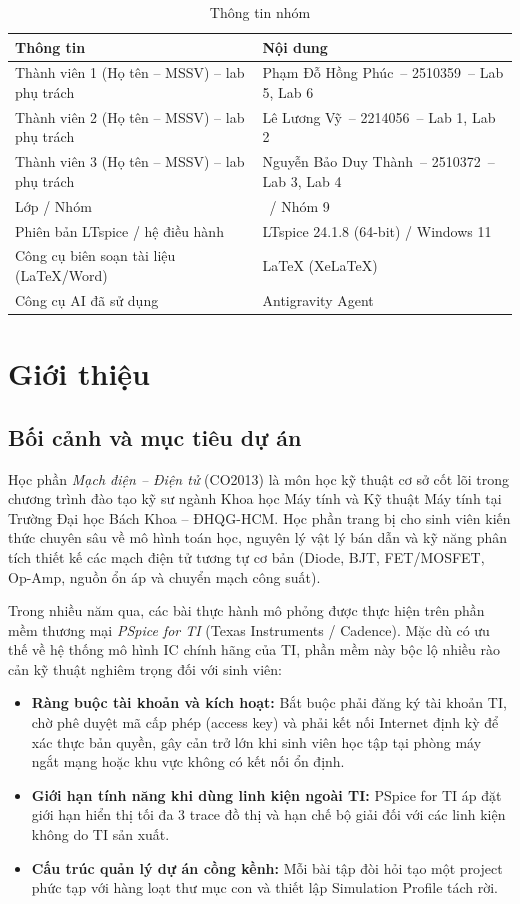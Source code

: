 \documentclass[12pt,a4paper]{article}
\newcommand{\NhomSo}{9}                          %
\newcommand{\LopHoc}{\dotuline}                  %
\newcommand{\TVa}{Phạm Đỗ Hồng Phúc}   \newcommand{\MSa}{2510359}   \newcommand{\PTa}{-- Lab 5, Lab 6}  %
\newcommand{\TVb}{Lê Lương Vỹ}          \newcommand{\MSb}{2214056}   \newcommand{\PTb}{-- Lab 1, Lab 2}  %
\newcommand{\TVc}{Nguyễn Bảo Duy Thành} \newcommand{\MSc}{2510372}   \newcommand{\PTc}{-- Lab 3, Lab 4}  %
\newcommand{\PhienBanLT}{LTspice 24.1.8 (64-bit) / Windows 11}                       %
\newcommand{\CongCuSoanThao}{LaTeX (XeLaTeX)}    %
\newcommand{\CongCuAI}{Antigravity Agent}                         %
\newcommand{\dotuline}{\makebox[2.6cm]{\dotfill}}
\newcommand{\hc}[1]{\cellcolor{navy}\color{white}\sffamily\bfseries\small #1}
\begin{document}
\begin{table}[H]\centering\small
\caption{Thông tin nhóm}
\renewcommand{\arraystretch}{1.5}
\begin{tabular}{|p{6.2cm}|p{8.8cm}|}
\hline
\hc{Thông tin} & \hc{Nội dung}\\ \hline
Thành viên 1 (Họ tên -- MSSV) -- lab phụ trách & \TVa\ -- \MSa\ \PTa\\ \hline
Thành viên 2 (Họ tên -- MSSV) -- lab phụ trách & \TVb\ -- \MSb\ \PTb\\ \hline
Thành viên 3 (Họ tên -- MSSV) -- lab phụ trách & \TVc\ -- \MSc\ \PTc\\ \hline
Lớp / Nhóm & \LopHoc\ / Nhóm \NhomSo\\ \hline
Phiên bản LTspice / hệ điều hành & \PhienBanLT\\ \hline
Công cụ biên soạn tài liệu (LaTeX/Word) & \CongCuSoanThao\\ \hline
Công cụ AI đã sử dụng & \CongCuAI\\ \hline
\end{tabular}
\end{table}

\section{Giới thiệu}

\subsection{Bối cảnh và mục tiêu dự án}
Học phần \textit{Mạch điện -- Điện tử} (CO2013) là môn học kỹ thuật cơ sở cốt lõi trong chương trình đào tạo kỹ sư ngành Khoa học Máy tính và Kỹ thuật Máy tính tại Trường Đại học Bách Khoa -- ĐHQG-HCM. Học phần trang bị cho sinh viên kiến thức chuyên sâu về mô hình toán học, nguyên lý vật lý bán dẫn và kỹ năng phân tích thiết kế các mạch điện tử tương tự cơ bản (Diode, BJT, FET/MOSFET, Op-Amp, nguồn ổn áp và chuyển mạch công suất).

Trong nhiều năm qua, các bài thực hành mô phỏng được thực hiện trên phần mềm thương mại \textit{PSpice for TI} (Texas Instruments / Cadence). Mặc dù có ưu thế về hệ thống mô hình IC chính hãng của TI, phần mềm này bộc lộ nhiều rào cản kỹ thuật nghiêm trọng đối với sinh viên:
\begin{itemize}[itemsep=2pt]
  \item \textbf{Ràng buộc tài khoản và kích hoạt:} Bắt buộc phải đăng ký tài khoản TI, chờ phê duyệt mã cấp phép (access key) và phải kết nối Internet định kỳ để xác thực bản quyền, gây cản trở lớn khi sinh viên học tập tại phòng máy ngắt mạng hoặc khu vực không có kết nối ổn định.
  \item \textbf{Giới hạn tính năng khi dùng linh kiện ngoài TI:} PSpice for TI áp đặt giới hạn hiển thị tối đa 3 trace đồ thị và hạn chế bộ giải đối với các linh kiện không do TI sản xuất.
  \item \textbf{Cấu trúc quản lý dự án cồng kềnh:} Mỗi bài tập đòi hỏi tạo một project phức tạp với hàng loạt thư mục con và thiết lập Simulation Profile tách rời.
\end{itemize}
\end{document}
